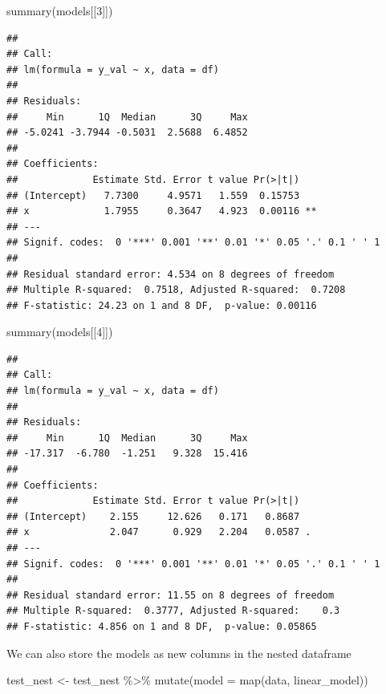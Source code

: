 \documentclass[
]{book}
\newenvironment{Shaded}{\begin{snugshade}}{\end{snugshade}}
\newcommand{\AttributeTok}[1]{\textcolor[rgb]{0.77,0.63,0.00}{#1}}
\newcommand{\DecValTok}[1]{\textcolor[rgb]{0.00,0.00,0.81}{#1}}
\newcommand{\FunctionTok}[1]{\textcolor[rgb]{0.00,0.00,0.00}{#1}}
\newcommand{\NormalTok}[1]{#1}
\newcommand{\OtherTok}[1]{\textcolor[rgb]{0.56,0.35,0.01}{#1}}
\newcommand{\SpecialCharTok}[1]{\textcolor[rgb]{0.00,0.00,0.00}{#1}}
\begin{document}
\begin{Shaded}
\begin{Highlighting}[]
\FunctionTok{summary}\NormalTok{(models[[}\DecValTok{3}\NormalTok{]])}
\end{Highlighting}
\end{Shaded}

\begin{verbatim}
## 
## Call:
## lm(formula = y_val ~ x, data = df)
## 
## Residuals:
##     Min      1Q  Median      3Q     Max 
## -5.0241 -3.7944 -0.5031  2.5688  6.4852 
## 
## Coefficients:
##             Estimate Std. Error t value Pr(>|t|)   
## (Intercept)   7.7300     4.9571   1.559  0.15753   
## x             1.7955     0.3647   4.923  0.00116 **
## ---
## Signif. codes:  0 '***' 0.001 '**' 0.01 '*' 0.05 '.' 0.1 ' ' 1
## 
## Residual standard error: 4.534 on 8 degrees of freedom
## Multiple R-squared:  0.7518, Adjusted R-squared:  0.7208 
## F-statistic: 24.23 on 1 and 8 DF,  p-value: 0.00116
\end{verbatim}

\begin{Shaded}
\begin{Highlighting}[]
\FunctionTok{summary}\NormalTok{(models[[}\DecValTok{4}\NormalTok{]])}
\end{Highlighting}
\end{Shaded}

\begin{verbatim}
## 
## Call:
## lm(formula = y_val ~ x, data = df)
## 
## Residuals:
##     Min      1Q  Median      3Q     Max 
## -17.317  -6.780  -1.251   9.328  15.416 
## 
## Coefficients:
##             Estimate Std. Error t value Pr(>|t|)  
## (Intercept)    2.155     12.626   0.171   0.8687  
## x              2.047      0.929   2.204   0.0587 .
## ---
## Signif. codes:  0 '***' 0.001 '**' 0.01 '*' 0.05 '.' 0.1 ' ' 1
## 
## Residual standard error: 11.55 on 8 degrees of freedom
## Multiple R-squared:  0.3777, Adjusted R-squared:    0.3 
## F-statistic: 4.856 on 1 and 8 DF,  p-value: 0.05865
\end{verbatim}

We can also store the models as new columns in the nested dataframe

\begin{Shaded}
\begin{Highlighting}[]
\NormalTok{test\_nest }\OtherTok{\textless{}{-}}\NormalTok{ test\_nest }\SpecialCharTok{\%\textgreater{}\%} 
  \FunctionTok{mutate}\NormalTok{(}\AttributeTok{model =} \FunctionTok{map}\NormalTok{(data, linear\_model))}
\end{Highlighting}
\end{Shaded}
\end{document}
